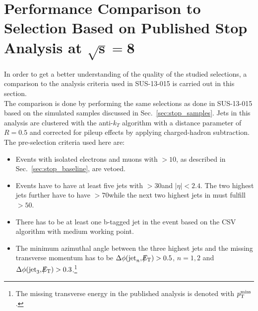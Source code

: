 \section[Performance Comparison to Selection Based on Published Stop Analysis]{Performance Comparison to Selection Based on Published Stop Analysis at $\mathbf{\sqrt{s} = 8}$\tev}
\label{sec:stop_pub}
In order to get a better understanding of the quality of the studied selections, a comparison to the analysis criteria used in SUS-13-015 is carried out in this section. \\
The comparison is done by performing the same selections as done in SUS-13-015 based on the simulated samples discussed in Sec.~\ref{sec:stop_samples}. Jets in this analysis are clustered with the anti-$k_T$ algorithm with a distance parameter of $R = 0.5$ and corrected for pileup effects by applying charged-hadron subtraction. The pre-selection criteria used here are:
\begin{itemize}
 \item Events with isolated electrons and muons with \pt$ > 10$\gev, as described in Sec.~\ref{sec:stop_baseline}, are vetoed.
 \item Events have to have at least five jets with \pt$ > 30$\gev and $|\eta| < 2.4$. The two highest \pt jets further have to have \pt$> 70$\gev while the next two highest jets in \pt must fulfill \pt$ > 50$\gev.
 \item There has to be at least one b-tagged jet in the event based on the CSV algorithm with medium working point. 
 \item The minimum azimuthal angle between the three highest jets and the missing transverse momentum has to be $\Delta \phi(\mathrm{jet}_n, \slash\mkern-12mu{E}_{\text{T}}) > 0.5$, $n = 1,2$ and $\Delta \phi(\mathrm{jet}_3, \slash\mkern-12mu{E}_{\text{T}}) > 0.3$.\footnote{The missing transverse energy in the published analysis is denoted with $p_{\text{T}}^\mathrm{miss}$.}%
\end{itemize}
